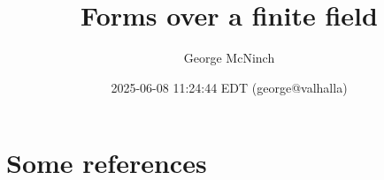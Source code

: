 \documentclass[11pt]{article}
\author{George McNinch}
\date{2025-06-08 11:24:44 EDT (george@valhalla)}
\title{Forms over a finite field}
\numberwithin{equation}{section}
\begin{document}
\maketitle
\section{Some references}
\label{sec:org4178d8a}
\end{document}
